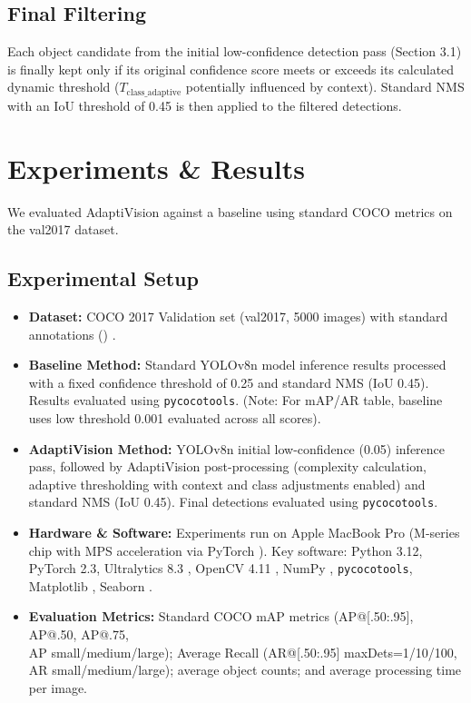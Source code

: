 \documentclass{article}
\begin{document}
\subsection{Final Filtering}
Each object candidate from the initial low-confidence detection pass (Section 3.1) is finally kept only if its original confidence score meets or exceeds its calculated dynamic threshold (\( T_{\text{class\_adaptive}} \) potentially influenced by context). Standard NMS with an IoU threshold of 0.45 is then applied to the filtered detections.

\section{Experiments \& Results} \label{sec:experiments}

We evaluated AdaptiVision against a baseline using standard COCO metrics on the val2017 dataset.

\subsection{Experimental Setup}

{\sloppy %
\begin{itemize}
    \item \textbf{Dataset:} COCO 2017 Validation set (val2017, 5000 images) with standard annotations () \cite{COCO}.
    \item \textbf{Baseline Method:} Standard YOLOv8n model inference results processed with a fixed confidence threshold of 0.25 and standard NMS (IoU 0.45). Results evaluated using \texttt{pycocotools}. (Note: For mAP/AR table, baseline uses low threshold 0.001 evaluated across all scores).
    \item \textbf{AdaptiVision Method:} YOLOv8n initial low-confidence (0.05) inference pass, followed by AdaptiVision post-processing (complexity calculation, adaptive thresholding with context and class adjustments enabled) and standard NMS (IoU 0.45). Final detections evaluated using \texttt{pycocotools}.
    \item \textbf{Hardware \& Software:} Experiments run on Apple MacBook Pro (M-series chip with MPS acceleration via PyTorch \cite{PyTorch}). Key software: Python 3.12, PyTorch 2.3, Ultralytics 8.3 \cite{YOLOv8}, OpenCV 4.11 \cite{OpenCV}, NumPy \cite{NumPy}, \texttt{pycocotools}, Matplotlib \cite{Matplotlib}, Seaborn \cite{Seaborn}.
    \item \textbf{Evaluation Metrics:} Standard COCO mAP metrics (AP@[.50:.95], AP@.50, AP@.75, \\ AP small/medium/large); Average Recall (AR@[.50:.95] maxDets=1/10/100, \\ AR small/medium/large); average object counts; and average processing time per image.
\end{itemize}
} %
\end{document}

